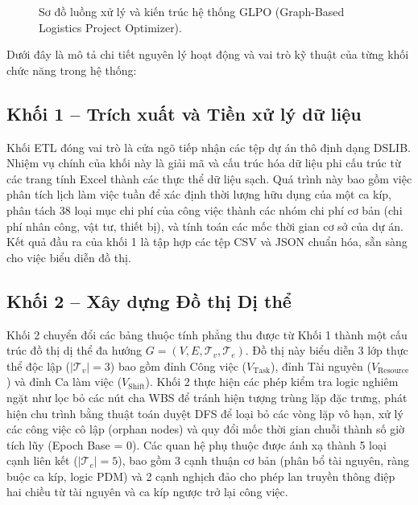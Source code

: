 \begin{figure}[H]
    \caption{Sơ đồ luồng xử lý và kiến trúc hệ thống GLPO (Graph-Based Logistics Project Optimizer).}
    \label{fig:overall_solution_flowchart}
\end{figure}

Dưới đây là mô tả chi tiết nguyên lý hoạt động và vai trò kỹ thuật của từng khối chức năng trong hệ thống:

\subsection{Khối 1 -- Trích xuất và Tiền xử lý dữ liệu}
Khối ETL đóng vai trò là cửa ngõ tiếp nhận các tệp dự án thô định dạng DSLIB. Nhiệm vụ chính của khối này là giải mã và cấu trúc hóa dữ liệu phi cấu trúc từ các trang tính Excel thành các thực thể dữ liệu sạch. Quá trình này bao gồm việc phân tích lịch làm việc tuần để xác định thời lượng hữu dụng của một ca kíp, phân tách 38 loại mục chi phí của công việc thành các nhóm chi phí cơ bản (chi phí nhân công, vật tư, thiết bị), và tính toán các mốc thời gian cơ sở của dự án. Kết quả đầu ra của khối 1 là tập hợp các tệp CSV và JSON chuẩn hóa, sẵn sàng cho việc biểu diễn đồ thị.

\subsection{Khối 2 -- Xây dựng Đồ thị Dị thể}
Khối 2 chuyển đổi các bảng thuộc tính phẳng thu được từ Khối 1 thành một cấu trúc đồ thị dị thể đa hướng $G = (V, E, \mathcal{T}_v, \mathcal{T}_e)$. Đồ thị này biểu diễn 3 lớp thực thể độc lập ($|\mathcal{T}_v| = 3$) bao gồm đỉnh Công việc ($V_{\text{Task}}$), đỉnh Tài nguyên ($V_{\text{Resource}}$) và đỉnh Ca làm việc ($V_{\text{Shift}}$). Khối 2 thực hiện các phép kiểm tra logic nghiêm ngặt như lọc bỏ các nút cha WBS để tránh hiện tượng trùng lặp đặc trưng, phát hiện chu trình bằng thuật toán duyệt DFS để loại bỏ các vòng lặp vô hạn, xử lý các công việc cô lập (orphan nodes) và quy đổi mốc thời gian chuỗi thành số giờ tích lũy (Epoch Base = 0). Các quan hệ phụ thuộc được ánh xạ thành 5 loại cạnh liên kết ($|\mathcal{T}_e| = 5$), bao gồm 3 cạnh thuận cơ bản (phân bổ tài nguyên, ràng buộc ca kíp, logic PDM) và 2 cạnh nghịch đảo cho phép lan truyền thông điệp hai chiều từ tài nguyên và ca kíp ngược trở lại công việc.

